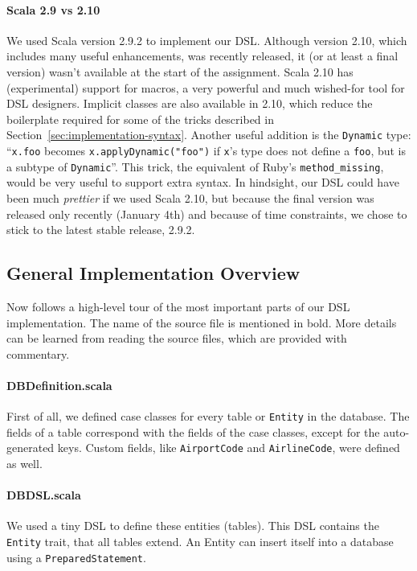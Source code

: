\documentclass[a4paper]{article}
\newcommand{\cc}[1]{\texttt{#1}}
\renewcommand{\sc}[1]{\lstinline{#1}}
\begin{document}
\paragraph{Scala 2.9 vs 2.10}

We used Scala version 2.9.2 to implement our DSL.
Although version 2.10, which includes many useful enhancements, was recently released, it (or at least a final version) wasn't available at the start of the assignment.
Scala 2.10 has (experimental) support for macros, a very powerful and much wished-for tool for DSL designers.
Implicit classes are also available in 2.10, which reduce the boilerplate required for some of the tricks described in Section~\ref{sec:implementation-syntax}.
Another useful addition is the \cc{Dynamic} type: ``\sc{x.foo} becomes \sc{x.applyDynamic("foo")} if \sc{x}'s type does not define a \sc{foo}, but is a subtype of \cc{Dynamic}''.
This trick, the equivalent of Ruby's \cc{method\_missing}, would be very useful to support extra syntax.
In hindsight, our DSL could have been much \emph{prettier} if we used Scala 2.10, but because the final version was released only recently (January 4th) and because of time constraints, we chose to stick to the latest stable release, 2.9.2.


\subsection{General Implementation Overview}
\label{sec:general-implementation-overview}

Now follows a high-level tour of the most important parts of our DSL implementation.
The name of the source file is mentioned in bold.
More details can be learned from reading the source files, which are provided with commentary.

\paragraph{DBDefinition.scala}
First of all, we defined case classes for every table or \cc{Entity} in the database.
The fields of a table correspond with the fields of the case classes, except for the auto-generated keys.
Custom fields, like \cc{Airport\-Code} and \cc{Air\-line\-Code}, were defined as well.

\paragraph{DBDSL.scala}
We used a tiny DSL to define these entities (tables).
This DSL contains the \cc{Entity} trait, that all tables extend.
An Entity can insert itself into a database using a \cc{PreparedStatement}.
\end{document}

